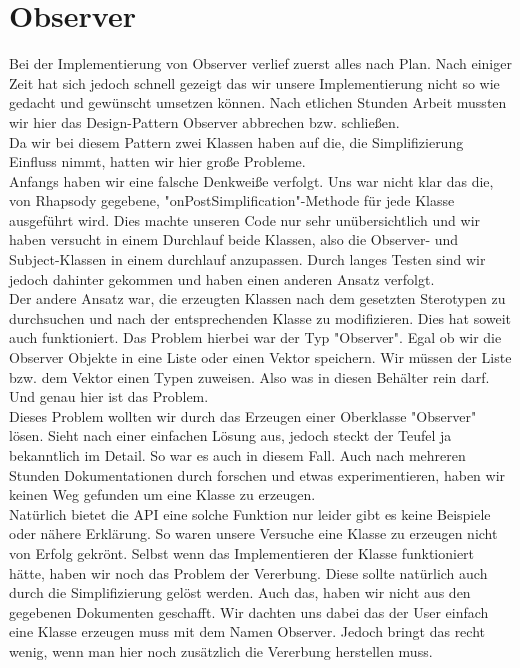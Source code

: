 \section{Observer}
Bei der Implementierung von Observer verlief zuerst alles nach Plan. Nach einiger
Zeit hat sich jedoch schnell gezeigt das wir unsere Implementierung nicht so wie
gedacht und gewünscht umsetzen können. Nach etlichen Stunden Arbeit mussten wir
hier das Design-Pattern Observer abbrechen bzw. schließen.\\
Da wir bei diesem Pattern zwei Klassen haben auf die, die Simplifizierung
Einfluss nimmt, hatten wir hier große Probleme.\\
Anfangs haben wir eine falsche Denkweiße verfolgt. Uns war nicht klar das die,
von Rhapsody gegebene, "onPostSimplification"-Methode für jede Klasse ausgeführt
wird.
Dies machte unseren Code nur sehr unübersichtlich und wir haben versucht in einem Durchlauf
beide Klassen, also die Observer- und Subject-Klassen in einem durchlauf
anzupassen. Durch langes Testen sind wir jedoch dahinter gekommen und haben
einen anderen Ansatz verfolgt.\\
Der andere Ansatz war, die erzeugten Klassen nach dem
gesetzten Sterotypen zu durchsuchen und nach der entsprechenden Klasse zu modifizieren.
Dies hat soweit auch funktioniert. Das Problem hierbei war der Typ "Observer". Egal ob
wir die Observer Objekte in eine Liste oder einen Vektor speichern. Wir müssen der 
Liste bzw. dem Vektor einen Typen zuweisen. Also was in diesen Behälter rein darf. Und
genau hier ist das Problem.\\
Dieses Problem wollten wir durch das Erzeugen einer Oberklasse "Observer" lösen.
Sieht nach einer einfachen Lösung aus, jedoch steckt der Teufel ja bekanntlich
im Detail. So war es auch in diesem Fall. Auch nach mehreren Stunden
Dokumentationen durch forschen und etwas experimentieren, haben wir keinen Weg
gefunden um eine Klasse zu erzeugen.\\
Natürlich bietet die API eine solche Funktion nur leider gibt es keine Beispiele
oder nähere Erklärung. So waren unsere Versuche eine Klasse zu erzeugen nicht
von Erfolg gekrönt. Selbst wenn das Implementieren der Klasse funktioniert
hätte, haben wir noch das Problem der Vererbung. Diese sollte natürlich auch
durch die Simplifizierung gelöst werden. Auch das, haben wir nicht aus den
gegebenen Dokumenten geschafft. Wir dachten uns dabei das der User einfach eine
Klasse erzeugen muss mit dem Namen Observer. Jedoch bringt das recht wenig, wenn
man hier noch zusätzlich die Vererbung herstellen muss.\\
